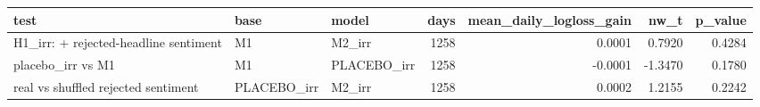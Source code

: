 \begin{tabular}{lllrrrr}
\toprule
test & base & model & days & mean\_daily\_logloss\_gain & nw\_t & p\_value \\
\midrule
H1\_irr: + rejected-headline sentiment & M1 & M2\_irr & 1258 & 0.0001 & 0.7920 & 0.4284 \\
placebo\_irr vs M1 & M1 & PLACEBO\_irr & 1258 & -0.0001 & -1.3470 & 0.1780 \\
real vs shuffled rejected sentiment & PLACEBO\_irr & M2\_irr & 1258 & 0.0002 & 1.2155 & 0.2242 \\
\bottomrule
\end{tabular}
